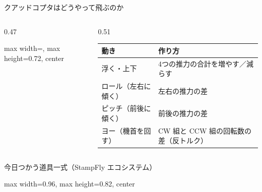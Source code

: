 \begin{frame}{クアッドコプタはどうやって飛ぶのか}
  \begin{columns}[c]
    \begin{column}{0.47\textwidth}
      \centering
      \begin{adjustbox}{max width=\columnwidth, max height=0.72\textheight, center}
        
      \end{adjustbox}
    \end{column}
    \begin{column}{0.51\textwidth}
      \begin{table}
        \centering\footnotesize
        \setlength{\tabcolsep}{3pt}
        \begin{tabular}{l>{\raggedright\arraybackslash}p{32mm}}
          \hline
          \textbf{動き} & \textbf{作り方} \\
          \hline
          浮く・上下 & 4つの推力の合計を増やす／減らす \\
          ロール（左右に傾く） & 左右の推力の差 \\
          ピッチ（前後に傾く） & 前後の推力の差 \\
          ヨー（機首を回す） & CW 組と CCW 組の回転数の差\newline（反トルク） \\
          \hline
        \end{tabular}
      \end{table}
    \end{column}
  \end{columns}

  \vspace{0.3em}

\end{frame}

\begin{frame}{今日つかう道具一式（StampFly エコシステム）}
  \centering
  \vspace{1mm}
  \begin{adjustbox}{max width=0.96\textwidth, max height=0.82\textheight, center}
    
  \end{adjustbox}
\end{frame}

